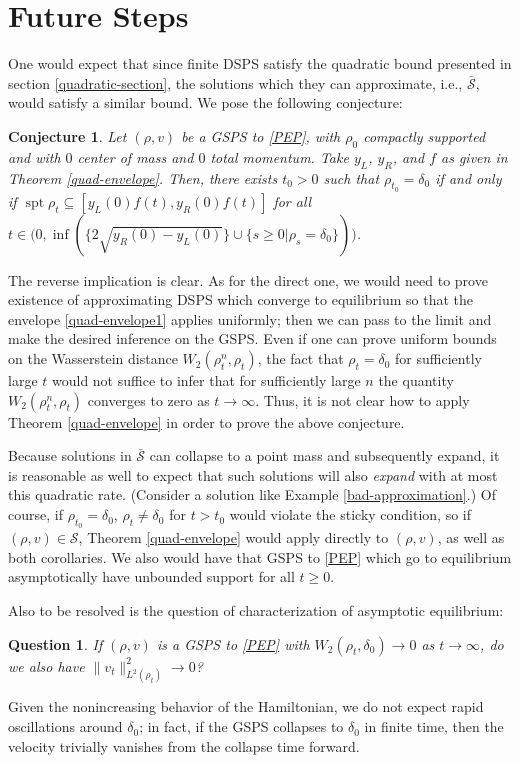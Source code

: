 \documentclass[11pt]{article}
\newtheorem{conjecture}[theorem]{Conjecture}
\newtheorem{question}[theorem]{Question}
\numberwithin{equation}{section}
\DeclareMathOperator{\spt}{spt}
\begin{document}
\section{Future Steps}\label{conjectures-section}
One would expect that since finite DSPS satisfy the quadratic bound presented in section \ref{quadratic-section}, the solutions which they can approximate, i.e., $\bar{\mathcal{S}}$, would satisfy a similar bound. We pose the following conjecture:
        \begin{conjecture}
            Let $(\rho,v)$ be a GSPS to \eqref{PEP}, with $\rho_0$ compactly supported and with $0$ center of mass and $0$ total momentum. Take $y_L$, $y_R$, and $f$ as given in Theorem \ref{quad-envelope}. Then, there exists $t_0>0$ such that $\rho_{t_0}=\delta_0$ if and only if $\spt\rho_t\subseteq[y_L(0)f(t),y_R(0)f(t)]$ for all $t\in\big(0,\inf(\{2\sqrt{y_R(0)-y_L(0)}\}\cup\{s\geq0|\rho_s=\delta_0\})\big)$. 
        \end{conjecture}
        The reverse implication is clear. As for the direct one, we would need to prove existence of approximating DSPS which converge to equilibrium so that the envelope \eqref{quad-envelope1} applies uniformly; then we can pass to the limit and make the desired inference on the GSPS. Even if one can prove uniform bounds on the Wasserstein distance $W_2(\rho_t^n,\rho_t)$, the fact that $\rho_t=\delta_0$ for sufficiently large $t$ would not suffice to infer that for sufficiently large $n$ the quantity $W_2(\rho_t^n,\rho_t)$ converges to zero as $t\rightarrow\infty$. Thus, it is not clear how to apply Theorem \ref{quad-envelope} in order to prove the above conjecture.
        
        Because solutions in $\bar{\mathcal{S}}$ can collapse to a point mass and subsequently expand, it is reasonable as well to expect that such solutions will also \emph{expand} with at most this quadratic rate. (Consider a solution like Example \ref{bad-approximation}.) Of course, if $\rho_{t_0}=\delta_0$, $\rho_t\neq\delta_0$ for $t>t_0$ would violate the sticky condition, so if $(\rho,v)\in\mathcal{S}$, Theorem \ref{quad-envelope} would apply directly to $(\rho,v)$, as well as both corollaries. We also would have that GSPS to \eqref{PEP} which go to equilibrium asymptotically have unbounded support for all $t \ge 0$.

        Also to be resolved is the question of characterization of asymptotic equilibrium: 
        \begin{question}
            If $(\rho,v)$ is a GSPS to \eqref{PEP} with $W_2(\rho_t,\delta_0)\to0$ as $t\to\infty$, do we also have $\|v_t\|_{L^2(\rho_t)}^2\to0$?
        \end{question} 
 Given the nonincreasing behavior of the Hamiltonian, we do not expect rapid oscillations around $\delta_0$; in fact, if the GSPS collapses to $\delta_0$ in finite time, then the velocity trivially vanishes from the collapse time forward.
 
\end{document}
